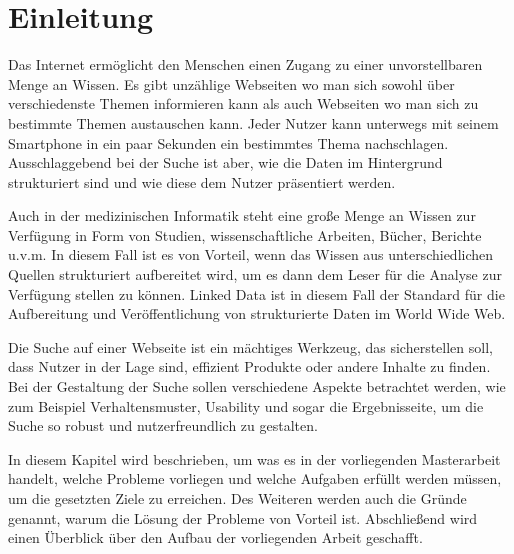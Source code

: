 \chapter{Einleitung}\label{ch:introduction}

Das Internet ermöglicht den Menschen einen Zugang zu einer unvorstellbaren Menge an Wissen. Es gibt unzählige Webseiten wo man sich sowohl über verschiedenste Themen informieren kann als auch Webseiten wo man sich zu bestimmte Themen austauschen kann. Jeder Nutzer kann unterwegs mit seinem Smartphone in ein paar Sekunden ein bestimmtes Thema nachschlagen. Ausschlaggebend bei der Suche ist aber, wie die Daten im Hintergrund strukturiert sind und wie diese dem Nutzer präsentiert werden.

Auch in der medizinischen Informatik steht eine große Menge an Wissen zur Verfügung in Form von Studien, wissenschaftliche Arbeiten, Bücher, Berichte u.v.m. In diesem Fall ist es von Vorteil, wenn das Wissen aus unterschiedlichen Quellen strukturiert aufbereitet wird, um es dann dem Leser für die Analyse zur Verfügung stellen zu können. Linked Data ist in diesem Fall der Standard für die Aufbereitung und Veröffentlichung von strukturierte Daten im World Wide Web. 

Die Suche auf einer Webseite ist ein mächtiges Werkzeug, das sicherstellen soll, dass Nutzer in der Lage sind, effizient Produkte oder andere Inhalte zu finden. Bei der Gestaltung der Suche sollen verschiedene Aspekte betrachtet werden, wie zum Beispiel Verhaltensmuster, Usability und sogar die Ergebnisseite, um die Suche so robust und nutzerfreundlich zu gestalten.

In diesem Kapitel wird beschrieben, um was es in der vorliegenden Masterarbeit handelt, welche Probleme vorliegen und welche Aufgaben erfüllt werden müssen, um die gesetzten Ziele zu erreichen. Des Weiteren werden auch die Gründe genannt, warum die Lösung der Probleme von Vorteil ist. Abschließend wird einen Überblick über den Aufbau der vorliegenden Arbeit geschafft.

